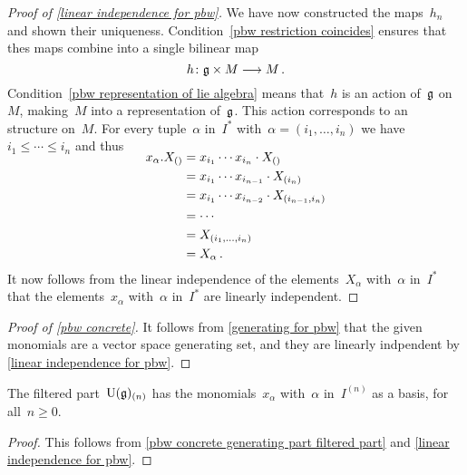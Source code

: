 \begin{proof}[Proof of \cref{linear independence for pbw}]
  We have now constructed the maps~$h_n$ and shown their uniqueness. 
  Condition~\ref{pbw restriction coincides} ensures that thes maps combine into a single bilinear map
  \[
    h
    \colon
    \glie \times M
    \to
    M \,.
  \]
  Condition~\ref{pbw representation of lie algebra} means that~$h$ is an action of~$\mathfrak{g}$ on~$M$, making~$M$ into a representation of~$\mathfrak{g}$.
  This action corresponds to an~\module{$\Univ(\glie)$} structure on~$M$.
  For every tuple~$\alpha$ in~$I^*$ with~$\alpha = (i_1, \dotsc, i_n)$ we have~$i_1 \leq \dotsb \leq i_n$ and thus
  \begin{align*}
    \SwapAboveDisplaySkip
    x_\alpha . X_{()}
    &=
    x_{i_1} \dotsm x_{i_n} \cdot X_{()}
    \\
    &=
    x_{i_1} \dotsm x_{i_{n-1}} \cdot X_{(i_n)}
    \\
    &=
    x_{i_1} \dotsm x_{i_{n-2}} \cdot X_{(i_{n-1}, i_n)}
    \\
    &=
    \dotsb
    \\
    &=
    X_{(i_1, \dotsc, i_n)}
    \\
    &=
    X_\alpha \,.
  \end{align*}
  It now follows from the linear independence of the elements~$X_\alpha$ with~$\alpha$ in~$I^*$ that the elements~$x_\alpha$ with~$\alpha$ in~$I^*$ are linearly independent.
\end{proof}


\begin{proof}[Proof of \cref{pbw concrete}]
  It follows from \cref{generating for pbw} that the given monomials are a vector space generating set, and they are linearly indpendent by \cref{linear independence for pbw}.
\end{proof}


\begin{corollary}
  \label{pbw concrete basis part filtered part}
  The filtered part~$\operatorname{U}(\mathfrak{g})_{(n)}$ has the monomials~$x_\alpha$ with~$\alpha$ in~$I^{(n)}$ as a basis, for all~$n \geq 0$.
\end{corollary}


\begin{proof}
  This follows from \cref{pbw concrete generating part filtered part} and \cref{linear independence for pbw}.
\end{proof}


